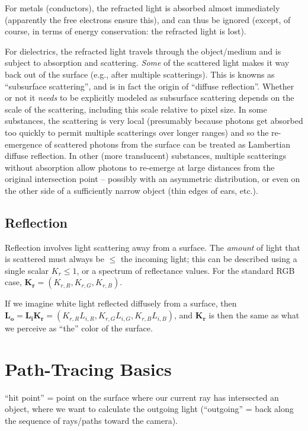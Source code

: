 \documentclass[11pt]{article}
\begin{document}
For metals (conductors), the refracted light is absorbed almost immediately (apparently the free
electrons ensure this), and can thus be ignored (except, of course, in terms of
energy conservation: the refracted light is lost).

For dielectrics, the refracted light travels through the object/medium
and is subject to absorption and scattering. \textit{Some} of the
scattered light makes it way back out of the surface (e.g., after
multiple scatterings). This is knowns as ``subsurface scattering'', and
is in fact the origin of ``diffuse reflection''. Whether or not it
\textit{needs} to be explicitly modeled as subsurface scattering depends
on the scale of the scattering, including this scale relative to pixel
size. In some substances, the scattering is very local (presumably
because photons get absorbed too quickly to permit multiple scatterings
over longer ranges) and so the re-emergence of scattered photons from
the surface can be treated as Lambertian diffuse reflection. In other
(more translucent) substances, multiple scatterings without absorption
allow photons to re-emerge at large distances from the original
intersection point -- possibly with an asymmetric distribution, or even
on the other side of a sufficiently narrow object (thin edges of ears,
etc.).



\subsection{Reflection}

Reflection involves light scattering away from a surface. The \textit{amount} of light
that is scattered must always be $\le$ the incoming light; this can be
described using a single scalar $K_{r} \le 1$, or a spectrum of reflectance values.
For the standard RGB case, $\mathbf{K_{r}} = (K_{r,R}, K_{r,G}, K_{r,B})$.

If we imagine white light reflected diffusely from a surface, then
$\mathbf{L_{o}} = \mathbf{L_{i}} \mathbf{K_{r}} = (K_{r,R} L_{i,R},
K_{r,G} L_{i,G}, K_{r,B} L_{i,B})$, and $\mathbf{K_{r}}$ is then the
same as what we perceive as ``the'' color of the surface.



\section{Path-Tracing Basics}

``hit point'' = point on the surface where our current ray has intersected
an object, where we want to calculate the outgoing light (``outgoing'' = back
along the sequence of rays/paths toward the camera).
\end{document}
